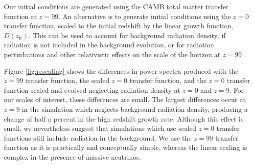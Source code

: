 \documentclass[useAMS, usenatbib]{mnras}
\begin{document}
Our initial conditions are generated using the CAMB total matter transfer
function at $z=99$. An alternative is to generate initial conditions
using the $z=0$ transfer function, scaled to the initial redshift by the
linear growth function, $D(z_\mathrm{ic})$. This can
be used to account for background radiation density, if radiation is not included
in the background evolution, or for radiation perturbations and other relativistic
effects on the scale of the horizon at $z=99$ \citep{Zennaro_2017}.

Figure \ref{fig:rescaling} shows the differences in power spectra
produced with the $z=99$ transfer function, the
scaled $z=0$ transfer function, and the $z=0$ transfer function
scaled and evolved neglecting radiation density at $z=0$ and $z=9$.
For our scales of interest, these differences are small.
The largest differences occur at $z=9$ in the simulation which neglects
background radiation density, producing a change of half a percent in
the high redshift growth rate. Although this effect is small, we nevertheless suggest that simulations
which use scaled $z=0$ transfer functions still include radiation in the background.
We use the $z=99$ transfer function as it is practically and conceptually simple,
whereas the linear scaling is complex in the presence of massive neutrinos.

\label{lastpage}


\end{document}
